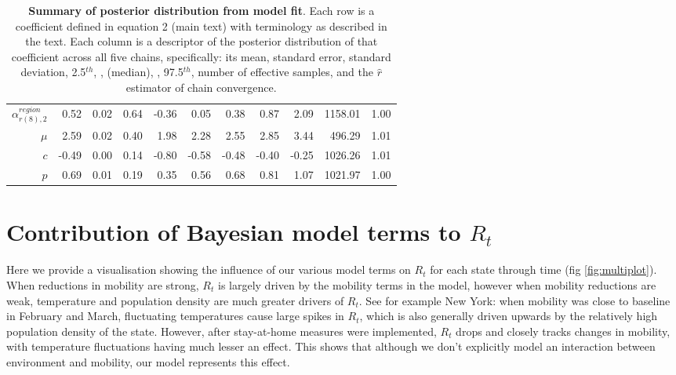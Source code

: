 \documentclass[12pt,english,a4paper]{article}
\begin{document}
\begin{table}[ht]
\begin{tabular}{rrrrrrrrrrr}
  $\alpha_{r(8),2}^{region}$ & 0.52 & 0.02 & 0.64 & -0.36 & 0.05 & 0.38 & 0.87 & 2.09 & 1158.01 & 1.00 \\ 
  $\mu$ & 2.59 & 0.02 & 0.40 & 1.98 & 2.28 & 2.55 & 2.85 & 3.44 & 496.29 & 1.01 \\ 
  $c$ & -0.49 & 0.00 & 0.14 & -0.80 & -0.58 & -0.48 & -0.40 & -0.25 & 1026.26 & 1.01 \\ 
  $p$ & 0.69 & 0.01 & 0.19 & 0.35 & 0.56 & 0.68 & 0.81 & 1.07 & 1021.97 & 1.00 \\ 
   \hline
\end{tabular}
\caption{\textbf{Summary of posterior distribution from model fit}. Each row is a coefficient defined in equation 2 (main text) with terminology as described in the text. Each column is a descriptor of the posterior distribution of that coefficient across all five chains, specifically: its mean, standard error, standard deviation, 2.5$^{th}$, ,  (median), , 97.5$^{th}$, number of effective samples, and the $\hat{r}$ estimator of chain convergence\cite{Gelman1992}.}
\label{tab:posterior_summary}
\end{table}



\clearpage

\section{Contribution of Bayesian model terms to $R_t$}

Here we provide a visualisation showing the influence of our various model terms on $R_t$ for each state through time (fig \ref{fig:multiplot}). When reductions in mobility are strong, $R_t$ is largely driven by the mobility terms in the model, however when mobility reductions are weak, temperature and population density are much greater drivers of $R_t$. See for example New York: when mobility was close to baseline in February and March, fluctuating temperatures cause large spikes in $R_t$, which is also generally driven upwards by the relatively high population density of the state. However, after stay-at-home measures were implemented, $R_t$ drops and closely tracks changes in mobility, with temperature fluctuations having much lesser an effect. This shows that although we don't explicitly model an interaction between environment and mobility, our model represents this effect. 
\end{document}
